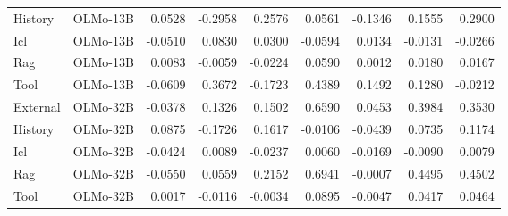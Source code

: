 \begin{tabular}{llrrrrrrr}
History & OLMo-13B & 0.0528 & -0.2958 & 0.2576 & 0.0561 & -0.1346 & 0.1555 & 0.2900 \\
Icl & OLMo-13B & -0.0510 & 0.0830 & 0.0300 & -0.0594 & 0.0134 & -0.0131 & -0.0266 \\
Rag & OLMo-13B & 0.0083 & -0.0059 & -0.0224 & 0.0590 & 0.0012 & 0.0180 & 0.0167 \\
Tool & OLMo-13B & -0.0609 & 0.3672 & -0.1723 & 0.4389 & 0.1492 & 0.1280 & -0.0212 \\
External & OLMo-32B & -0.0378 & 0.1326 & 0.1502 & 0.6590 & 0.0453 & 0.3984 & 0.3530 \\
History & OLMo-32B & 0.0875 & -0.1726 & 0.1617 & -0.0106 & -0.0439 & 0.0735 & 0.1174 \\
Icl & OLMo-32B & -0.0424 & 0.0089 & -0.0237 & 0.0060 & -0.0169 & -0.0090 & 0.0079 \\
Rag & OLMo-32B & -0.0550 & 0.0559 & 0.2152 & 0.6941 & -0.0007 & 0.4495 & 0.4502 \\
Tool & OLMo-32B & 0.0017 & -0.0116 & -0.0034 & 0.0895 & -0.0047 & 0.0417 & 0.0464 \\
\bottomrule
\end{tabular}
